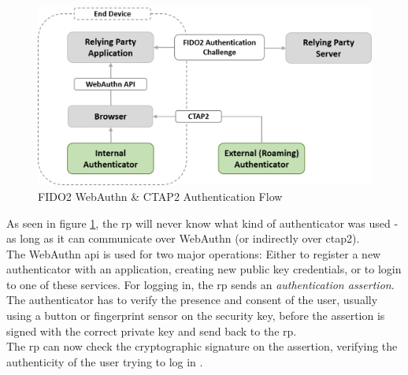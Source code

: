 \begin{figure}[!h]
    \centering
    \includegraphics[width=1.8\columnwidth]{Figures/fido2_webauth_ctap_flow.png}
    \caption[FIDO2 Authentication Flow]{FIDO2 WebAuthn \& CTAP2 Authentication Flow}
    \label{fig:fido2_webauth_ctap_flow}
\end{figure}

\noindent As seen in figure \ref{fig:fido2_webauth_ctap_flow}, the \ac{rp} will never know what kind of authenticator was used - as long as it can communicate over WebAuthn (or indirectly over \ac{ctap2}).\\
The WebAuthn \ac{api} is used for two major operations: Either to register a new authenticator with an application, creating new public key credentials, or to login to one of these services. For logging in, the \ac{rp} sends an \emph{authentication assertion}. The authenticator has to verify the presence and consent of the user, usually using a button or fingerprint sensor on the security key, before the assertion is signed with the correct private key and send back to the \ac{rp}.\\
The \ac{rp} can now check the cryptographic signature on the assertion, verifying the authenticity of the user trying to log in \cite{webauthn_standard,mdn_webauthn}.